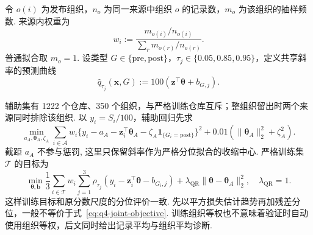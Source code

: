 \begin{definition}[组织权重与联合分位模型]\label{def:q4-joint-quantile}
令 $o(i)$ 为发布组织，$n_o$ 为同一来源中组织 $o$ 的记录数，$m_o$ 为该组织的抽样频数. 来源内权重为
\[
w_i:=\frac{m_{o(i)}/n_{o(i)}}{\sum_r m_{o(r)}/n_{o(r)}}.
\]
普通拟合取 $m_o=1$. 设类型 $G\in\{\mathrm{pre},\mathrm{post}\}$，$\tau_j\in\{0.05,0.85,0.95\}$，定义共享斜率的预测曲线
\begin{equation}\label{eq:q4-joint-quantile}
\widehat q_{\tau_j}(\boldsymbol x,G)
:=100(\boldsymbol z^\top\boldsymbol\theta+b_{G,j}).
\end{equation}
\end{definition}
辅助集有 1222 个仓库、350 个组织，与严格训练仓库互斥；整组织留出时两个来源同时排除该组织. 以 $y_i=S_i/100$，辅助回归先求
\begin{equation}\label{eq:q4-auxiliary-ridge}
\min_{a_A,\boldsymbol\theta_A,\zeta_A}
\sum_{i\in\mathcal A}w_i
\{y_i-a_A-\boldsymbol z_i^\top\boldsymbol\theta_A
-\zeta_A\mathbf1_{\{G_i=\mathrm{post}\}}\}^2
+0.01(\|\boldsymbol\theta_A\|_2^2+\zeta_A^2).
\end{equation}
截距 $a_A$ 不参与惩罚, 这里只保留斜率作为严格分位拟合的收缩中心. 严格训练集 $\mathcal T$ 的目标为
\begin{equation}\label{eq:q4-joint-objective}
\min_{\boldsymbol\theta,\boldsymbol b}
\frac13\sum_{i\in\mathcal T}w_i\sum_{j=1}^3
\rho_{\tau_j}(y_i-\boldsymbol z_i^\top\boldsymbol\theta-b_{G_i,j})
+\lambda_{\mathrm{QR}}\|\boldsymbol\theta-\boldsymbol\theta_A\|_2^2,
\quad\lambda_{\mathrm{QR}}=1.
\end{equation}
这样训练目标和原分数尺度的分位评价一致. 先以平方损失估计趋势再加残差分位，一般不等价于式~\eqref{eq:q4-joint-objective}. 训练组织等权也不意味着验证时自动使用组织等权，后文同时给出记录平均与组织平均诊断. 

